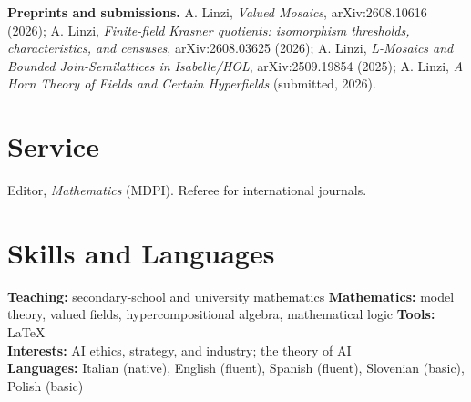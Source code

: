\documentclass[10pt,a4paper]{article}
\begin{document}
\textbf{Preprints and submissions.} A. Linzi, \emph{Valued Mosaics}, arXiv:2608.10616 (2026); A. Linzi, \emph{Finite-field Krasner quotients: isomorphism thresholds, characteristics, and censuses}, arXiv:2608.03625 (2026); A. Linzi, \emph{L-Mosaics and Bounded Join-Semilattices in Isabelle/HOL}, arXiv:2509.19854 (2025); A. Linzi, \emph{A Horn Theory of Fields and Certain Hyperfields} (submitted, 2026).

\section*{Service}

Editor, \emph{Mathematics} (MDPI). Referee for international journals.

\section*{Skills and Languages}

\textbf{Teaching:} secondary-school and university mathematics \textperiodcentered{}
\textbf{Mathematics:} model theory, valued fields, hypercompositional algebra, mathematical logic \textperiodcentered{}
\textbf{Tools:} \LaTeX\\[0.3em]
\textbf{Interests:} AI ethics, strategy, and industry; the theory of AI\\[0.3em]
\textbf{Languages:} Italian (native), English (fluent), Spanish (fluent), Slovenian (basic), Polish (basic)
\end{document}
